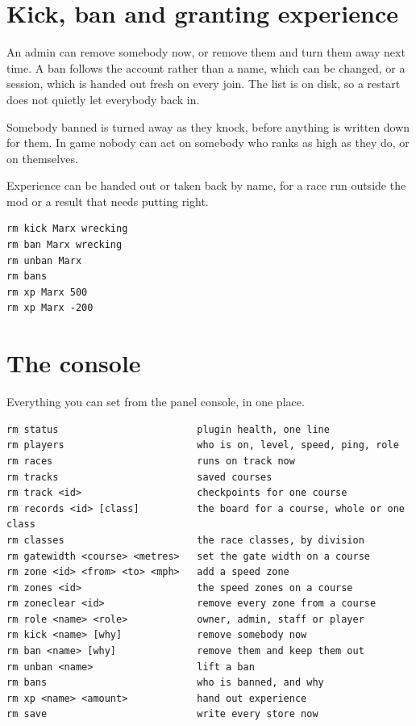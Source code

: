 \documentclass[11pt,a4paper]{article}
\begin{document}
\section{Kick, ban and granting experience}

An admin can remove somebody now, or remove them and turn them away next time.
A ban follows the account rather than a name, which can be changed, or a
session, which is handed out fresh on every join. The list is on disk, so a
restart does not quietly let everybody back in.

Somebody banned is turned away as they knock, before anything is written down
for them. In game nobody can act on somebody who ranks as high as they do, or
on themselves.

Experience can be handed out or taken back by name, for a race run outside the
mod or a result that needs putting right.

\begin{lstlisting}
rm kick Marx wrecking
rm ban Marx wrecking
rm unban Marx
rm bans
rm xp Marx 500
rm xp Marx -200
\end{lstlisting}

\section{The console}

Everything you can set from the panel console, in one place.

\begin{lstlisting}
rm status                        plugin health, one line
rm players                       who is on, level, speed, ping, role
rm races                         runs on track now
rm tracks                        saved courses
rm track <id>                    checkpoints for one course
rm records <id> [class]          the board for a course, whole or one class
rm classes                       the race classes, by division
rm gatewidth <course> <metres>   set the gate width on a course
rm zone <id> <from> <to> <mph>   add a speed zone
rm zones <id>                    the speed zones on a course
rm zoneclear <id>                remove every zone from a course
rm role <name> <role>            owner, admin, staff or player
rm kick <name> [why]             remove somebody now
rm ban <name> [why]              remove them and keep them out
rm unban <name>                  lift a ban
rm bans                          who is banned, and why
rm xp <name> <amount>            hand out experience
rm save                          write every store now
\end{lstlisting}
\end{document}

